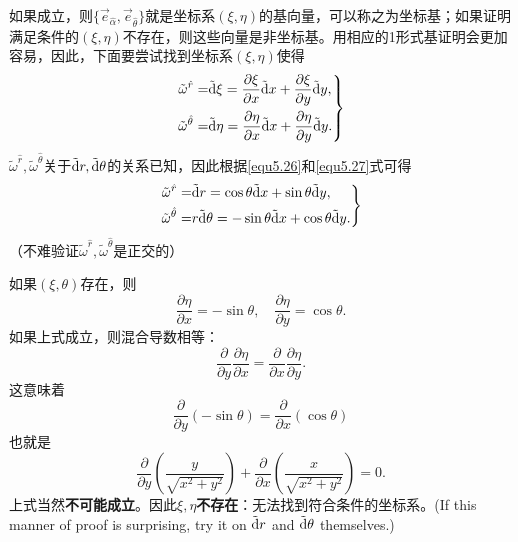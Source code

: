 如果成立，则$\{ \vec{e}_{\hat{\alpha}}, \vec{e}_{\hat{\theta}} \}$就是坐标系$(\xi, \eta)$的基向量，可以称之为坐标基；如果证明满足条件的$(\xi, \eta)$不存在，则这些向量是非坐标基。用相应的1形式基证明会更加容易，因此，下面要尝试找到坐标系$(\xi, \eta)$使得
\begin{equation}
\left.
\begin{split}
    \tilde{\omega}^{\hat{r}} =& \tilde{\mathrm{d}} \xi = \frac{\partial \xi}{\partial x} \tilde{\mathrm{d}} x + \frac{\partial \xi}{\partial y} \tilde{\mathrm{d}} y, \\
    \tilde{\omega}^{\hat{\theta}} =& \tilde{\mathrm{d}} \eta = \frac{\partial \eta}{\partial x} \tilde{\mathrm{d}} x + \frac{\partial \eta}{\partial y} \tilde{\mathrm{d}} y.
\end{split}
\right\}
\label{equ5.80}
\end{equation}
$\tilde{\omega}^{\hat{r}}, \tilde{\omega}^{\hat{\theta}}$关于$\tilde{\mathrm{d}} r, \tilde{\mathrm{d}} \theta$的关系已知，因此根据\eqref{equ5.26}和\eqref{equ5.27}式可得
\begin{equation}
\left.
\begin{split}
    \tilde{\omega}^{\hat{r}} =& \tilde{\mathrm{d}} r = \cos \theta \tilde{\mathrm{d}} x + \sin \theta \tilde{\mathrm{d}} y, \\
    \tilde{\omega}^{\hat{\theta}} =& r \tilde{\mathrm{d}} \theta = -\sin \theta \tilde{\mathrm{d}} x + \cos \theta \tilde{\mathrm{d}} y.
\end{split}
\right\}
\label{equ5.81}
\end{equation}
（不难验证$\tilde{\omega}^{\hat{r}}, \tilde{\omega}^{\hat{\theta}}$是正交的）

如果$(\xi, \theta)$存在，则
\begin{equation}
    \frac{\partial \eta}{\partial x} = -\sin \theta, \quad \frac{\partial \eta}{\partial y} = \cos \theta.
\label{equ5.82}
\end{equation}
如果上式成立，则混合导数相等：
\begin{equation}
    \frac{\partial}{\partial y} \frac{\partial \eta}{\partial x} = \frac{\partial}{\partial x} \frac{\partial \eta}{\partial y}.
\label{equ5.83}
\end{equation}
这意味着
\begin{equation}
    \frac{\partial}{\partial y} (-\sin \theta) = \frac{\partial}{\partial x} (\cos \theta)
\label{equ5.84}
\end{equation}
也就是
\begin{equation*}
    \frac{\partial}{\partial y} \left( \frac{y}{\sqrt{x^2 + y^2}} \right) + \frac{\partial}{\partial x} \left( \frac{x}{\sqrt{x^2 + y^2}} \right)  = 0.
\end{equation*}
上式当然\textbf{不可能成立}。因此$\xi, \eta$\textbf{不存在}：无法找到符合条件的坐标系。(If this manner of proof is surprising, try it on $\tilde{\mathrm{d}} r$ and $\tilde{\mathrm{d}} \theta$ themselves.)

